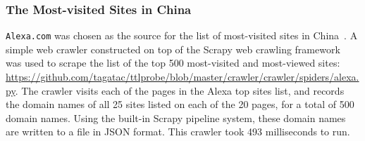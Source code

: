 \subsubsection{The Most-visited Sites in China}\label{alexa}
\texttt{Alexa.com} was chosen as the source for the list of most-visited sites in China~\cite{AlexaCN}.
A simple web crawler constructed on top of the Scrapy web crawling framework~\cite{Scrapy} was used to scrape the list of the top 500 most-visited and most-viewed sites: \url{https://github.com/tagatac/ttlprobe/blob/master/crawler/crawler/spiders/alexa.py}.
The crawler visits each of the pages in the Alexa top sites list, and records the domain names of all 25 sites listed on each of the 20 pages, for a total of 500 domain names.
Using the built-in Scrapy pipeline system, these domain names are written to a file in JSON format.
This crawler took 493 milliseconds to run.
